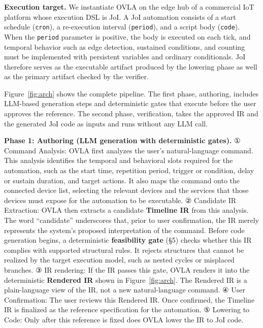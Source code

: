 \documentclass[sigconf,nonacm,anonymous,review]{acmart}
\begin{document}
\textbf{Execution target.} We instantiate OVLA on the edge hub of a commercial IoT platform whose execution DSL is JoI. A JoI automation consists of a start schedule (\texttt{cron}), a re-execution interval (\texttt{period}), and a script body (\texttt{code}). When the \texttt{period} parameter is positive, the body is executed on each tick, and temporal behavior such as edge detection, sustained conditions, and counting must be implemented with persistent variables and ordinary conditionals. JoI therefore serves as the executable artifact produced by the lowering phase as well as the primary artifact checked by the verifier.

Figure~\ref{fig:arch} shows the complete pipeline. The first phase, authoring, includes LLM-based generation steps and deterministic gates that execute before the user approves the reference. The second phase, verification, takes the approved IR and the generated JoI code as inputs and runs without any LLM call.

\textbf{Phase 1: Authoring (LLM generation with deterministic gates).} ① Command Analysis: OVLA first analyzes the user's natural-language command. This analysis identifies the temporal and behavioral slots required for the automation, such as the start time, repetition period, trigger or condition, delay or sustain duration, and target actions. It also maps the command onto the connected device list, selecting the relevant devices and the services that those devices must expose for the automation to be executable. ② Candidate IR Extraction: OVLA then extracts a candidate \textbf{Timeline IR} from this analysis. The word ``candidate'' underscores that, prior to user confirmation, the IR merely represents the system's proposed interpretation of the command. Before code generation begins, a deterministic \textbf{feasibility gate} (\S5) checks whether this IR complies with supported structural rules. It rejects structures that cannot be realized by the target execution model, such as nested cycles or misplaced branches. ③ IR rendering: If the IR passes this gate, OVLA renders it into the deterministic \textbf{Rendered IR} shown in Figure~\ref{fig:arch}. The Rendered IR is a plain-language view of the IR, not a new natural-language command. ④ User Confirmation: The user reviews this Rendered IR. Once confirmed, the Timeline IR is finalized as the reference specification for the automation. ⑤ Lowering to Code: Only after this reference is fixed does OVLA lower the IR to JoI code.
\end{document}
